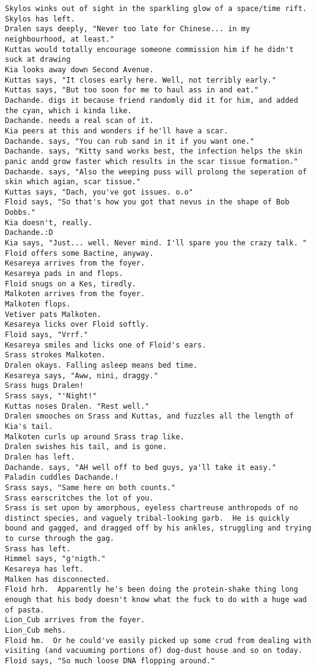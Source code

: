 \begin{verbatim}
Skylos winks out of sight in the sparkling glow of a space/time rift.
Skylos has left.
Dralen says deeply, "Never too late for Chinese... in my neighbourhood, at least."
Kuttas would totally encourage someone commission him if he didn't suck at drawing
Kia looks away down Second Avenue.
Kuttas says, "It closes early here. Well, not terribly early."
Kuttas says, "But too soon for me to haul ass in and eat."
Dachande. digs it because friend randomly did it for him, and added the cyan, which i kinda like.
Dachande. needs a real scan of it.
Kia peers at this and wonders if he'll have a scar.
Dachande. says, "You can rub sand in it if you want one."
Dachande. says, "Kitty sand works best, the infection helps the skin panic andd grow faster which results in the scar tissue formation."
Dachande. says, "Also the weeping puss will prolong the seperation of skin which agian, scar tissue."
Kuttas says, "Dach, you've got issues. o.o"
Floid says, "So that's how you got that nevus in the shape of Bob Dobbs."
Kia doesn't, really.
Dachande.:D
Kia says, "Just... well. Never mind. I'll spare you the crazy talk. "
Floid offers some Bactine, anyway.
Kesareya arrives from the foyer.
Kesareya pads in and flops.
Floid snugs on a Kes, tiredly.
Malkoten arrives from the foyer.
Malkoten flops.
Vetiver pats Malkoten.
Kesareya licks over Floid softly.
Floid says, "Vrrf."
Kesareya smiles and licks one of Floid's ears.
Srass strokes Malkoten.
Dralen okays. Falling asleep means bed time.
Kesareya says, "Aww, nini, draggy."
Srass hugs Dralen!
Srass says, "'Night!"
Kuttas noses Dralen. "Rest well."
Dralen smooches on Srass and Kuttas, and fuzzles all the length of Kia's tail.
Malkoten curls up around Srass trap like.
Dralen swishes his tail, and is gone.
Dralen has left.
Dachande. says, "AH well off to bed guys, ya'll take it easy."
Paladin cuddles Dachande.!
Srass says, "Same here on both counts."
Srass earscritches the lot of you.
Srass is set upon by amorphous, eyeless chartreuse anthropods of no distinct species, and vaguely tribal-looking garb.  He is quickly bound and gagged, and dragged off by his ankles, struggling and trying to curse through the gag.
Srass has left.
Himmel says, "g'nigth."
Kesareya has left.
Malken has disconnected.
Floid hrh.  Apparently he's been doing the protein-shake thing long enough that his body doesn't know what the fuck to do with a huge wad of pasta.
Lion_Cub arrives from the foyer.
Lion_Cub mehs.
Floid hm.  Or he could've easily picked up some crud from dealing with visiting (and vacuuming portions of) dog-dust house and so on today.
Floid says, "So much loose DNA flopping around."

\end{verbatim}
